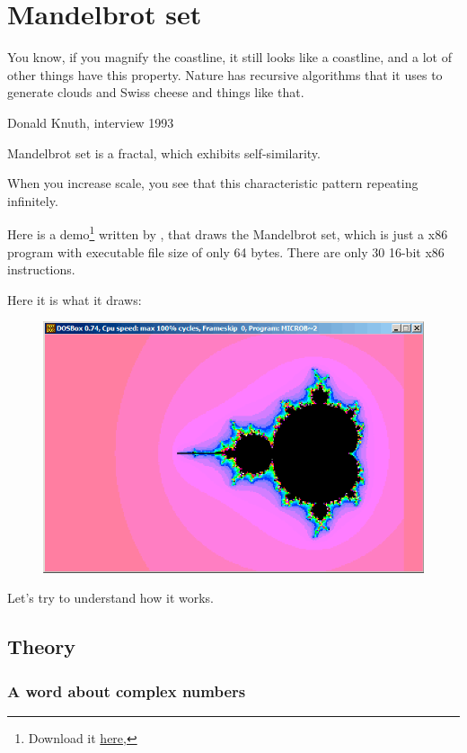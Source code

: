 ﻿\clearpage
\section{Mandelbrot set}
\label{Mandelbrot_demo}

\epigraph{You know, if you magnify the coastline, it still looks like
a coastline, and a lot of other things have this property. Nature has
recursive algorithms that it uses to generate clouds and Swiss cheese
and things like that.}
{Donald Knuth, interview 1993}

Mandelbrot set is a fractal, which exhibits self-similarity.

When you increase scale, you see that this characteristic pattern repeating infinitely.

Here is a demo\footnote{Download it \href{http://go.yurichev.com/17306}
{here},} 
written by  , 
that draws 
the Mandelbrot set, which is just a x86 program with executable file size of only 64 bytes.
There are only 30 16-bit x86 instructions.

Here it is what it draws:

\begin{figure}[H]
\centering
\includegraphics[scale=\FigScale]{examples/demos/mandelbrot/1.png}
\end{figure}

Let's try to understand how it works.

\clearpage
\subsection{Theory}

\subsubsection{A word about complex numbers}


